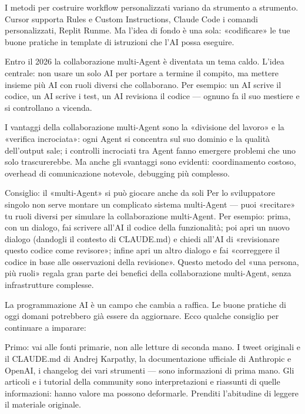 I metodi per costruire workflow personalizzati variano da strumento a strumento. Cursor supporta Rules e Custom Instructions, Claude Code i comandi personalizzati, Replit Runme. Ma l'idea di fondo è una sola: «codificare» le tue buone pratiche in template di istruzioni che l'AI possa eseguire.


Entro il 2026 la collaborazione multi-Agent è diventata un tema caldo. L'idea centrale: non usare un solo AI per portare a termine il compito, ma mettere insieme più AI con ruoli diversi che collaborano. Per esempio: un AI scrive il codice, un AI scrive i test, un AI revisiona il codice — ognuno fa il suo mestiere e si controllano a vicenda.

I vantaggi della collaborazione multi-Agent sono la «divisione del lavoro» e la «verifica incrociata»: ogni Agent si concentra sul suo dominio e la qualità dell'output sale; i controlli incrociati tra Agent fanno emergere problemi che uno solo trascurerebbe. Ma anche gli svantaggi sono evidenti: coordinamento costoso, overhead di comunicazione notevole, debugging più complesso.

\begin{tcbinfo}{Consiglio: il «multi-Agent» si può giocare anche da soli}
Per lo sviluppatore singolo non serve montare un complicato sistema multi-Agent — puoi «recitare» tu ruoli diversi per simulare la collaborazione multi-Agent. Per esempio: prima, con un dialogo, fai scrivere all'AI il codice della funzionalità; poi apri un nuovo dialogo (dandogli il contesto di CLAUDE.md) e chiedi all'AI di «revisionare questo codice come revisore»; infine apri un altro dialogo e fai «correggere il codice in base alle osservazioni della revisione». Questo metodo del «una persona, più ruoli» regala gran parte dei benefici della collaborazione multi-Agent, senza infrastrutture complesse.

\end{tcbinfo}


La programmazione AI è un campo che cambia a raffica. Le buone pratiche di oggi domani potrebbero già essere da aggiornare. Ecco qualche consiglio per continuare a imparare:

Primo: vai alle fonti primarie, non alle letture di seconda mano. I tweet originali e il CLAUDE.md di Andrej Karpathy, la documentazione ufficiale di Anthropic e OpenAI, i changelog dei vari strumenti — sono informazioni di prima mano. Gli articoli e i tutorial della community sono interpretazioni e riassunti di quelle informazioni: hanno valore ma possono deformarle. Prenditi l'abitudine di leggere il materiale originale.

